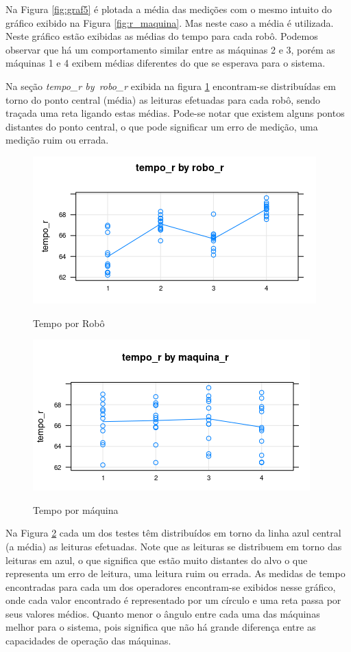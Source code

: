 \documentclass[
12pt,					%
openright,				%
oneside,				%
a4paper,				%
english,
brazil
]{ABNT/abntex2_report}
\begin{document}
Na Figura \ref{fig:graf5} é plotada a média das medições com o mesmo intuito do gráfico exibido na Figura \ref{fig:r_maquina}. Mas neste caso a média é utilizada. Neste gráfico estão exibidas as médias do tempo para cada robô. Podemos observar que há um comportamento similar entre as máquinas 2 e 3, porém as máquinas 1 e 4 exibem médias diferentes do que se esperava para o
sistema.

Na seção \textit{tempo\_r by\ robo\_r} exibida na figura \ref{fig:tempo_robo} encontram-se distribuídas em torno do ponto central (média) as leituras efetuadas para cada robô, sendo traçada uma reta ligando estas médias. Pode-se notar que existem alguns pontos distantes do ponto central, o que pode significar um erro de medição, uma medição ruim ou errada.
\begin{figure}[H]
	\centering
	\caption{Tempo por Robô}
	\includegraphics[scale=0.9]{figures/graf2.png}
	\label{fig:tempo_robo}
\end{figure}

\begin{figure}[H]
	\centering
	\caption{Tempo por máquina}
	\includegraphics[scale = 0.9]{figures/graf4.png}
	\label{fig:graf4}
\end{figure}

Na Figura \ref{fig:graf4} cada um dos testes têm distribuídos em torno da linha azul central (a média) as leituras efetuadas. Note que as leituras se distribuem em torno das leituras em azul, o que significa que estão muito distantes do alvo o que representa um erro de leitura, uma leitura ruim ou errada. As medidas de tempo encontradas para cada um dos operadores encontram-se exibidos nesse gráfico, onde cada valor encontrado é representado por um círculo e uma reta passa por seus valores médios. Quanto menor o ângulo entre cada uma das máquinas melhor para o sistema, pois significa que não há grande diferença entre as capacidades de operação das máquinas.
\end{document}
